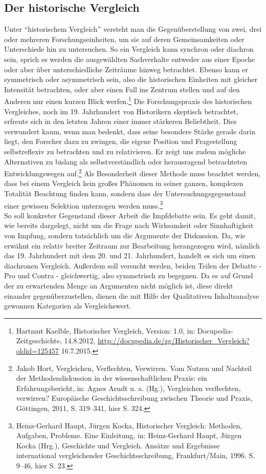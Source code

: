 \documentclass[
    a4paper,
    12pt,
    hyphens,
    chapterprefix=true,
    headheight=33pt,
    footheight=29pt,
    headings=optiontohead,
]{scrartcl}
\begin{document}
 \subsection{Der historische Vergleich}
Unter "`historischem Vergleich"' versteht man die Gegenüberstellung von zwei, drei oder mehreren Forschungseinheiten, um sie auf deren Gemeinsamkeiten oder Unterschiede hin zu untersuchen. So ein Vergleich kann synchron oder diachron sein, sprich es werden die ausgewählten Sachverhalte entweder aus einer Epoche oder aber über unterschiedliche Zeiträume hinweg betrachtet. Ebenso kann er symmetrisch oder asymmetrisch sein, also die historischen Einheiten mit gleicher Intensität betrachten, oder aber einen Fall ins Zentrum stellen und auf den Anderen nur einen kurzen Blick werfen.\footnote{Hartmut Kaelble, Historischer Vergleich, Version: 1.0, in: Docupedia-Zeitgeschichte, 14.8.2012, \url{http://docupedia.de/zg/Historischer_Vergleich?oldid=125457} 16.7.2015.}
Die Forschungspraxis des historischen Vergleiches, noch im 19. Jahrhundert von Historikern skeptisch betrachtet, erfreute sich in den letzten Jahren einer immer stärkeren Beliebtheit. Dies verwundert kaum, wenn man bedenkt, dass seine besondere Stärke gerade darin liegt, den Forscher dazu zu zwingen, die eigene Position und Fragestellung selbstreflexiv zu betrachten und zu relativieren. Er zeigt uns zudem mögliche Alternativen zu bislang als selbstverständlich oder herausragend betrachteten Entwicklungswegen auf.\footnote{Jakob Hort, Vergleichen, Verflechten, Verwirren. Vom Nutzen und Nachteil der Methodendiskussion in der wissenschaftlichen Praxis: ein Erfahrungsbericht, in: Agnes Arndt u. a. (Hg.), Vergleichen verflechten, verwirren? Europäische  Geschichtsschreibung zwischen Theorie und Praxis, Göttingen, 2011, S. 319--341, hier S. 324.}  Als Besonderheit dieser Methode muss beachtet werden, dass bei einem Vergleich kein großes Phänomen in seiner ganzen, komplexen Totalität Beachtung finden kann, sondern dass der Untersuchungsgegenstand einer gewissen Selektion unterzogen werden muss.\footnote{Heinz-Gerhard Haupt, Jürgen Kocka, Historischer Vergleich: Methoden, Aufgaben, Probleme. Eine Einleitung, in: Heinz-Gerhard Haupt, Jürgen Kocka (Hrg.), Geschichte und Vergleich. Ansätze und Ergebnisse international vergleichender Geschichtsschreibung, Frankfurt/Main, 1996. S. 9--46, hier S. 23.}\\
So soll konkreter Gegenstand dieser Arbeit die Impfdebatte sein. Es geht damit, wie bereits dargelegt, nicht um die Frage nach Wirksamkeit oder Sinnhaftigkeit von Impfung, sondern tatsächlich um die Argumente der Diskussion. Da, wie erwähnt ein relativ breiter Zeitraum zur Bearbeitung herangezogen wird, nämlich das 19. Jahrhundert mit dem 20. und 21. Jahrhundert, handelt es sich um einen diachronen Vergleich. Außerdem soll versucht werden, beiden Teilen der Debatte - Pro und Contra - gleichwertig, also symmetrisch zu begegnen. Da es auf Grund der zu erwartenden Menge an Argumenten nicht möglich ist, diese direkt einander gegenüberzustellen, dienen die mit Hilfe der Qualitativen Inhaltsanalyse gewonnen Kategorien als Vergleichswert.
\end{document}
